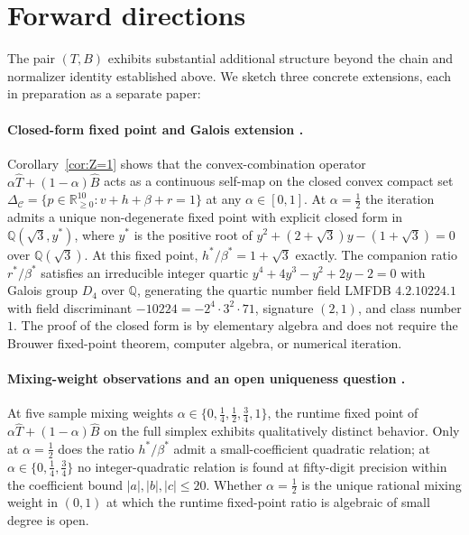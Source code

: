 \documentclass[11pt,reqno]{amsart}
\theoremstyle{plain}
\theoremstyle{definition}
\theoremstyle{remark}
\newcommand{\Q}{\mathbb{Q}}
\newcommand{\R}{\mathbb{R}}
\newcommand{\Cfour}{\mathcal{C}}
\begin{document}
\section{Forward directions}\label{sec:forward}

The pair $(T,B)$ exhibits substantial additional structure beyond
the chain and normalizer identity established above. We sketch
three concrete extensions, each in preparation as a separate
paper:

\paragraph{Closed-form fixed point and Galois extension
\cite{SandersGish2026FixedPoint}.}
Corollary~\ref{cor:Z=1} shows that the convex-combination
operator $\alpha\widehat{T}+(1-\alpha)\widehat{B}$ acts as a
continuous self-map on the closed convex compact set
$\Delta_{\Cfour}=\{p\in\R^{10}_{\geq 0}:v+h+\beta+r=1\}$ at any
$\alpha\in[0,1]$. At $\alpha=\tfrac12$ the iteration admits a
unique non-degenerate fixed point with explicit closed form in
$\Q(\sqrt{3},y^{*})$, where $y^{*}$ is the positive root of
$y^{2}+(2+\sqrt{3})y-(1+\sqrt{3})=0$ over $\Q(\sqrt{3})$. At this
fixed point, $h^{*}/\beta^{*}=1+\sqrt{3}$ exactly. The companion
ratio $r^{*}/\beta^{*}$ satisfies an irreducible integer quartic
$y^{4}+4y^{3}-y^{2}+2y-2=0$ with Galois group $D_{4}$ over $\Q$,
generating the quartic number field LMFDB \textnumero
$4.2.10224.1$ with field discriminant $-10224=-2^{4}\cdot 3^{2}\cdot 71$,
signature $(2,1)$, and class number $1$. The proof of the closed
form is by elementary algebra and does not require the Brouwer
fixed-point theorem, computer algebra, or numerical iteration.

\paragraph{Mixing-weight observations and an open uniqueness
question \cite{SandersGish2026MixingWeight}.}
At five sample mixing weights
$\alpha\in\{0,\tfrac14,\tfrac12,\tfrac34,1\}$, the runtime
fixed point of $\alpha\widehat{T}+(1-\alpha)\widehat{B}$ on the
full simplex exhibits qualitatively distinct behavior. Only at
$\alpha=\tfrac12$ does the ratio $h^{*}/\beta^{*}$ admit a
small-coefficient quadratic relation; at $\alpha\in\{0,\tfrac14,\tfrac34\}$
no integer-quadratic relation is found at fifty-digit precision
within the coefficient bound $|a|,|b|,|c|\leq 20$. Whether
$\alpha=\tfrac12$ is the unique rational mixing weight in
$(0,1)$ at which the runtime fixed-point ratio is algebraic of
small degree is open.
\end{document}
